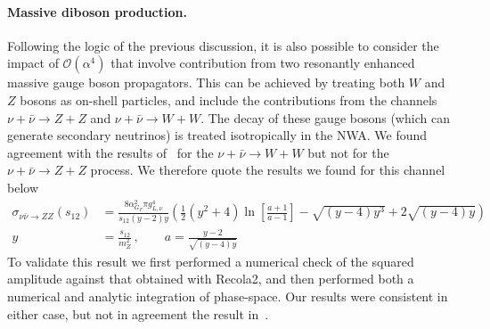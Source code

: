 \documentclass[a4paper,11pt]{article}
\begin{document}
\paragraph{Massive diboson production.}
Following the logic of the previous discussion, it is also possible to consider the impact of $\mathcal{O}(\alpha^4)$ that involve contribution from two resonantly enhanced massive gauge boson propagators.
%
This can be achieved by treating both $W$ and $Z$ bosons as on-shell particles, and include the contributions from the channels $\nu + \bar \nu \to Z + Z$ and $\nu + \bar \nu \to W + W$.
The decay of these gauge bosons (which can generate secondary neutrinos) is treated isotropically in the NWA.
%
We found agreement with the results of~\cite{Roulet:1992pz} for the $\nu + \bar \nu \to W + W$ but not for the $\nu + \bar \nu \to Z + Z$ process.
We therefore quote the results we found for this channel below
%
\begin{align} \nonumber
\sigma_{\nu \bar \nu \to Z Z}(s_{12})  &=\frac{8 \alpha_{G_F}^2 \pi g_{L,\nu}^4}{s_{12} (y-2) y}
\left(  \frac{1}{2} (y^2+4) \ln \left[ \frac{a+1}{a-1}  \right] - \sqrt{(y-4)y^3} + 2 \sqrt{(y-4)y} \right) \\
y &= \frac{s_{12}}{m_Z^2} \,,\qquad a = \frac{y-2}{\sqrt{(y-4)y}}
\end{align}
%
To validate this result we first performed a numerical check of the squared amplitude against that obtained with Recola2, and then performed both a numerical and analytic integration of phase-space.
Our results were consistent in either case, but not in agreement the result in~\cite{Roulet:1992pz}.


\end{document}
